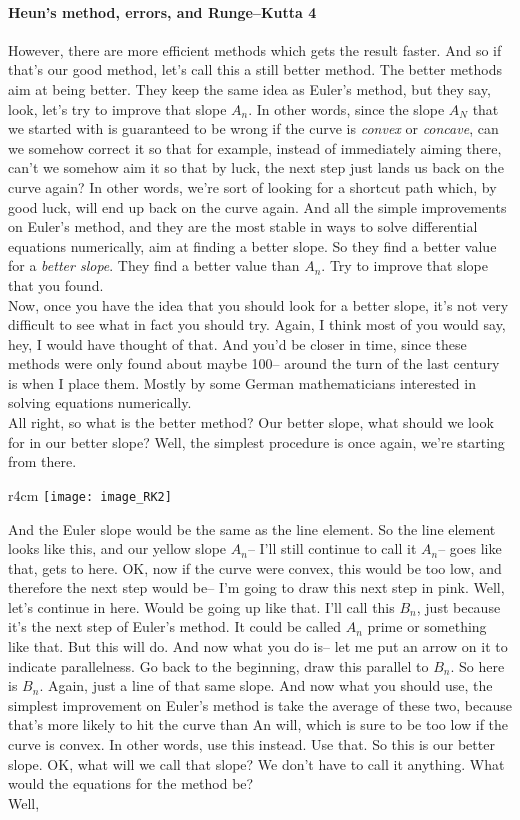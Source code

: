 \paragraph{Heun's method, errors, and Runge–Kutta 4}
However, there are more efficient methods which gets the result faster.
And so if that's our good method, let's call this a still better method.
The better methods aim at being better.
They keep the same idea as Euler's method,
but they say, look, let's try to improve that slope $A_n$.
In other words, since the slope $A_N$ that we started with is guaranteed to be wrong
if the curve is \emph{convex} or \emph{concave},
can we somehow correct it so that for example,
instead of immediately aiming there,
can't we somehow aim it so that by luck, the next step just lands us back on the curve again?
In other words, we're sort of looking for a shortcut
path which, by good luck, will end up back on the curve again.
And all the simple improvements on Euler's method,
and they are the most stable in ways
to solve differential equations numerically, aim at finding a better slope.
So they find a better value for a \emph{better slope}.
They find a better value than $A_n$.
Try to improve that slope that you found.\\
Now, once you have the idea that you should look for a better
slope, it's not very difficult to see what in fact you should try.
Again, I think most of you would say, hey, I would have thought of that.
And you'd be closer in time, since these methods were only
found about maybe 100--
around the turn of the last century is when I place them.
Mostly by some German mathematicians interested in solving equations numerically. \\
All right, so what is the better method?
Our better slope, what should we look for in our better slope?
Well, the simplest procedure is once again,
we're starting from there.

\begin{wrapfigure}{r}{4cm}
  \texttt{[image: image\_RK2]}
\end{wrapfigure}

And the Euler slope would be the same as the line element.
So the line element looks like this, and our yellow slope $A_n$--
I'll still continue to call it $A_n$-- goes like that, gets to here.
OK, now if the curve were convex, this would be too low,
and therefore the next step would be--
I'm going to draw this next step in pink.
Well, let's continue in here.
Would be going up like that.
I'll call this $B_n$, just because it's the next step of Euler's method.
It could be called $A_n$ prime or something like that.
But this will do.
And now what you do is-- let me put an arrow on it to indicate parallelness.
Go back to the beginning, draw this parallel to $B_n$. So here is $B_n$.
Again, just a line of that same slope.
And now what you should use, the simplest improvement
on Euler's method is take the average of these two,
because that's more likely to hit
the curve than An will, which is sure to be too low if the curve is convex.
In other words, use this instead.
Use that.
So this is our better slope.
OK, what will we call that slope?
We don't have to call it anything.
What would the equations for the method be?\\
Well,

